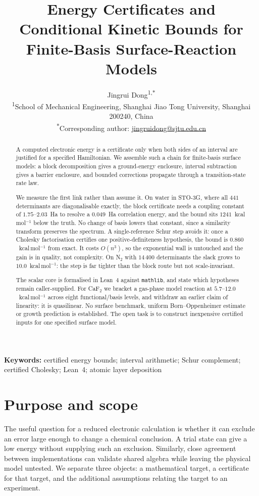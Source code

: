 \documentclass[11pt,a4paper]{article}
\title{Energy Certificates and Conditional Kinetic Bounds for
Finite-Basis Surface-Reaction Models}
\author{%
Jingrui Dong\textsuperscript{1,$*$}\\[4pt]
\small \textsuperscript{1}School of Mechanical Engineering,
Shanghai Jiao Tong University, Shanghai 200240, China\\[2pt]
\small \textsuperscript{$*$}Corresponding author:
\href{mailto:jingruidong@sjtu.edu.cn}{jingruidong@sjtu.edu.cn}}
\date{}
\theoremstyle{plain}
\theoremstyle{definition}
\theoremstyle{remark}
\begin{document}
\maketitle

\begin{abstract}
A computed electronic energy is a certificate only when both sides of an
interval are justified for a specified Hamiltonian. We assemble such a chain for
finite-basis surface models: a block decomposition gives a
ground-energy enclosure, interval subtraction gives a barrier enclosure, and
bounded corrections propagate through a transition-state rate law.

We measure the first link rather than assume it. On water in STO-3G, where all
$441$ determinants are diagonalisable exactly, the block certificate needs a
coupling constant of $1.75$--$2.03$~Ha to resolve a $0.049$~Ha correlation
energy, and the bound sits $1241$~kcal\,mol$^{-1}$ below the truth.
No change of basis lowers that constant, since a similarity transform preserves
the spectrum. A single-reference Schur step avoids it: once a Cholesky
factorisation certifies one positive-definiteness hypothesis, the bound is
$0.860$~kcal\,mol$^{-1}$ from exact. It costs $O(n^{3})$, so the exponential wall
is untouched and the gain is in quality, not complexity. On N$_2$ with
$14\,400$ determinants the slack grows to $10.0$~kcal\,mol$^{-1}$: the step is far
tighter than the block route but not scale-invariant.

The scalar core is formalised in Lean~4 against \texttt{mathlib}, and state
which hypotheses remain caller-supplied. For CaF$_2$ we bracket a gas-phase model
reaction at $5.7$--$12.0$~kcal\,mol$^{-1}$ across eight functional/basis levels,
and withdraw an earlier claim of linearity: it is quasilinear. No surface benchmark, uniform Born--Oppenheimer estimate or growth
prediction is established. The open task is to construct inexpensive certified
inputs for one specified surface model.
\end{abstract}

\vspace{0.6em}
\noindent\textbf{Keywords:} certified energy bounds; interval arithmetic;
Schur complement; certified Cholesky; Lean~4; atomic layer deposition
\vspace{0.4em}

\section{Purpose and scope}
\label{sec:intro}
The useful question for a reduced electronic calculation is whether it can
exclude an error large enough to change a chemical conclusion. A trial state
can give a low energy without supplying such an exclusion. Similarly, close
agreement between implementations can validate shared algebra while leaving
the physical model untested. We separate three objects: a mathematical target,
a certificate for that target, and the additional assumptions relating the
target to an experiment.
\end{document}
